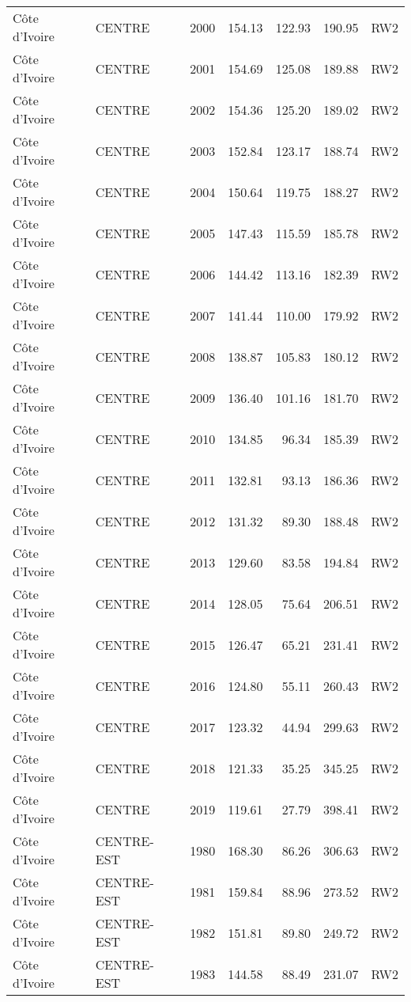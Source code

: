 \begin{longtable}{lllrrrl}
  C\^{o}te d'Ivoire & CENTRE & 2000 & 154.13 & 122.93 & 190.95 & RW2 \\ 
  C\^{o}te d'Ivoire & CENTRE & 2001 & 154.69 & 125.08 & 189.88 & RW2 \\ 
  C\^{o}te d'Ivoire & CENTRE & 2002 & 154.36 & 125.20 & 189.02 & RW2 \\ 
  C\^{o}te d'Ivoire & CENTRE & 2003 & 152.84 & 123.17 & 188.74 & RW2 \\ 
  C\^{o}te d'Ivoire & CENTRE & 2004 & 150.64 & 119.75 & 188.27 & RW2 \\ 
  C\^{o}te d'Ivoire & CENTRE & 2005 & 147.43 & 115.59 & 185.78 & RW2 \\ 
  C\^{o}te d'Ivoire & CENTRE & 2006 & 144.42 & 113.16 & 182.39 & RW2 \\ 
  C\^{o}te d'Ivoire & CENTRE & 2007 & 141.44 & 110.00 & 179.92 & RW2 \\ 
  C\^{o}te d'Ivoire & CENTRE & 2008 & 138.87 & 105.83 & 180.12 & RW2 \\ 
  C\^{o}te d'Ivoire & CENTRE & 2009 & 136.40 & 101.16 & 181.70 & RW2 \\ 
  C\^{o}te d'Ivoire & CENTRE & 2010 & 134.85 & 96.34 & 185.39 & RW2 \\ 
  C\^{o}te d'Ivoire & CENTRE & 2011 & 132.81 & 93.13 & 186.36 & RW2 \\ 
  C\^{o}te d'Ivoire & CENTRE & 2012 & 131.32 & 89.30 & 188.48 & RW2 \\ 
  C\^{o}te d'Ivoire & CENTRE & 2013 & 129.60 & 83.58 & 194.84 & RW2 \\ 
  C\^{o}te d'Ivoire & CENTRE & 2014 & 128.05 & 75.64 & 206.51 & RW2 \\ 
  C\^{o}te d'Ivoire & CENTRE & 2015 & 126.47 & 65.21 & 231.41 & RW2 \\ 
  C\^{o}te d'Ivoire & CENTRE & 2016 & 124.80 & 55.11 & 260.43 & RW2 \\ 
  C\^{o}te d'Ivoire & CENTRE & 2017 & 123.32 & 44.94 & 299.63 & RW2 \\ 
  C\^{o}te d'Ivoire & CENTRE & 2018 & 121.33 & 35.25 & 345.25 & RW2 \\ 
  C\^{o}te d'Ivoire & CENTRE & 2019 & 119.61 & 27.79 & 398.41 & RW2 \\ 
  C\^{o}te d'Ivoire & CENTRE-EST & 1980 & 168.30 & 86.26 & 306.63 & RW2 \\ 
  C\^{o}te d'Ivoire & CENTRE-EST & 1981 & 159.84 & 88.96 & 273.52 & RW2 \\ 
  C\^{o}te d'Ivoire & CENTRE-EST & 1982 & 151.81 & 89.80 & 249.72 & RW2 \\ 
  C\^{o}te d'Ivoire & CENTRE-EST & 1983 & 144.58 & 88.49 & 231.07 & RW2 \\ 

\end{longtable}
